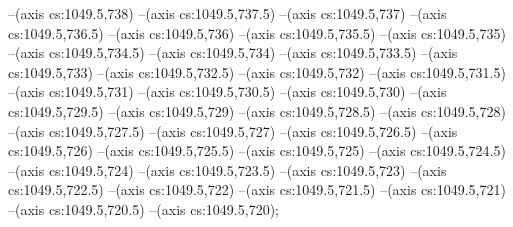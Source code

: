 --(axis cs:1049.5,738)
--(axis cs:1049.5,737.5)
--(axis cs:1049.5,737)
--(axis cs:1049.5,736.5)
--(axis cs:1049.5,736)
--(axis cs:1049.5,735.5)
--(axis cs:1049.5,735)
--(axis cs:1049.5,734.5)
--(axis cs:1049.5,734)
--(axis cs:1049.5,733.5)
--(axis cs:1049.5,733)
--(axis cs:1049.5,732.5)
--(axis cs:1049.5,732)
--(axis cs:1049.5,731.5)
--(axis cs:1049.5,731)
--(axis cs:1049.5,730.5)
--(axis cs:1049.5,730)
--(axis cs:1049.5,729.5)
--(axis cs:1049.5,729)
--(axis cs:1049.5,728.5)
--(axis cs:1049.5,728)
--(axis cs:1049.5,727.5)
--(axis cs:1049.5,727)
--(axis cs:1049.5,726.5)
--(axis cs:1049.5,726)
--(axis cs:1049.5,725.5)
--(axis cs:1049.5,725)
--(axis cs:1049.5,724.5)
--(axis cs:1049.5,724)
--(axis cs:1049.5,723.5)
--(axis cs:1049.5,723)
--(axis cs:1049.5,722.5)
--(axis cs:1049.5,722)
--(axis cs:1049.5,721.5)
--(axis cs:1049.5,721)
--(axis cs:1049.5,720.5)
--(axis cs:1049.5,720);


